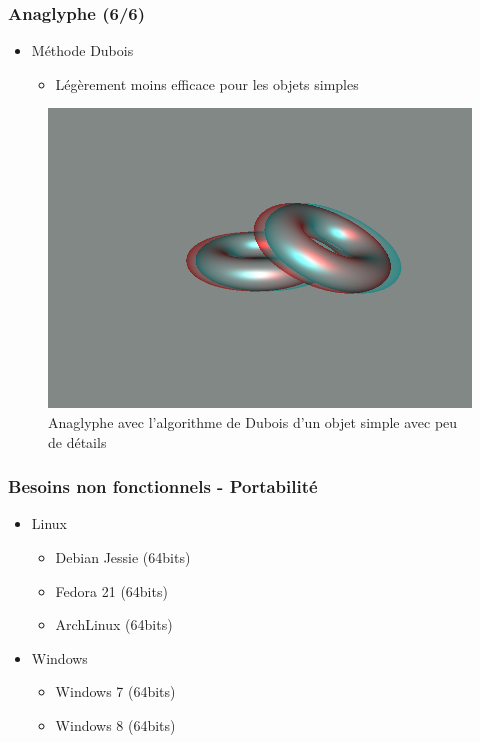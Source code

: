 \documentclass{beamer}
\begin{document}
%
% 
\begin{frame}
\frametitle{Anaglyphe (6/6)}
\begin{itemize}[label=$\bullet$]
\item Méthode Dubois \cite{algoDubois}
	\begin{itemize}[label=$\circ$]
	\item Légèrement moins efficace pour les objets simples 
	\end{itemize}
\end{itemize}
\begin{figure}
\centering
\includegraphics[scale=0.35]{donuts_dubois.png}
\caption{Anaglyphe avec l'algorithme de Dubois d'un objet simple avec peu de détails}
\end{figure}
\end{frame}

\begin{frame}
\frametitle{Besoins non fonctionnels - Portabilité}
\begin{itemize}[label=$\bullet$]
 	\item Linux
 	\begin{itemize}[label=$\checkmark$]
	\item Debian Jessie (64bits)
	\item Fedora 21 (64bits)
	\item ArchLinux (64bits)
	\end{itemize}
	\item Windows
	\begin{itemize}[label=$\checkmark$]
	\item Windows 7 (64bits)
	\item Windows 8 (64bits)
	\end{itemize}
\end{itemize}

\end{frame}
\end{document}
